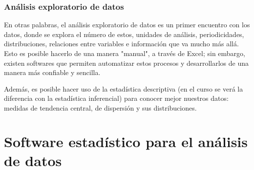 \begin{frame}[fragile] 
    \frametitle{Análisis exploratorio de datos}
    \begin{center}
        En otras palabras, el análisis exploratorio de datos es un primer encuentro con los datos, donde se explora el número de estos, unidades de análisis, periodicidades, distribuciones, relaciones entre variables e información que va mucho más allá.  Esto es posible hacerlo de una manera "manual", a través de Excel; sin embargo, existen softwares que permiten automatizar estos procesos y desarrollarlos de una manera más confiable y sencilla.\newline 
    \end{center}
    
    \begin{center}    
        Además, es posible hacer uso de la estadística descriptiva (en el curso se verá la diferencia con la estadística inferencial) para conocer mejor nuestros datos: medidas de tendencia central, de dispersión y sus distribuciones. 
    \end{center}

\end{frame}

\section{Software estadístico para el análisis de datos}

